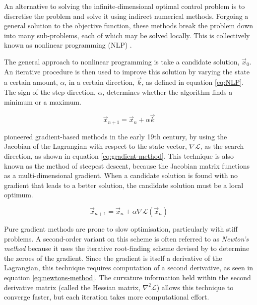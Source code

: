 An alternative to solving the infinite-dimensional optimal control problem is to discretise the problem and solve it using indirect numerical methods. Forgoing a general solution to the objective function, these methods break the problem down into many sub-problems, each of which may be solved locally. This is collectively known as nonlinear programming (NLP) \parencite{Betts1998}. 

The general approach to nonlinear programming is take a candidate solution, $\vec{x}_0$. An iterative procedure is then used to improve this solution by varying the state a certain amount, $\alpha$, in a certain direction, $\vec{k}$, as defined in equation \eqref{eq:NLP}. The sign of the step direction, $\alpha$, determines whether the algorithm finds a minimum or a maximum.

\begin{equation} \label{eq:NLP}
\vec{x}_{n+1}=\vec{x}_n+\alpha\vec{k}
\end{equation}

\textcite{Gauss1827} pioneered gradient-based methods in the early 19th century, by using the Jacobian of the Lagrangian with respect to the state vector, $\nabla\mathcal{L}$, as the search direction, as shown in equation \eqref{eq:gradient-method}. This technique is also known as the method of steepest descent, because the Jacobian matrix functions as a multi-dimensional gradient. When a candidate solution is found with no gradient that leads to a better solution, the candidate solution must be a local optimum.

\begin{equation} \label{eq:gradient-method}
\vec{x}_{n+1}=\vec{x}_n + \alpha\nabla\mathcal{L}(\vec{x}_n)
\end{equation}

Pure gradient methods are prone to slow optimisation, particularly with stiff problems. %
A second-order variant on this scheme is often referred to as \emph{Newton's method} because it uses the iterative root-finding scheme devised by \textcite{Newton1711, Newton1736} to determine the zeroes of the gradient. Since the gradient is itself a derivative of the Lagrangian, this technique requires computation of a second derivative, as seen in equation \eqref{eq:newtons-method}. The curvature information held within the second derivative matrix (called the Hessian matrix, $\nabla^2\mathcal{L}$) allows this technique to converge faster, but each iteration takes more computational effort.

